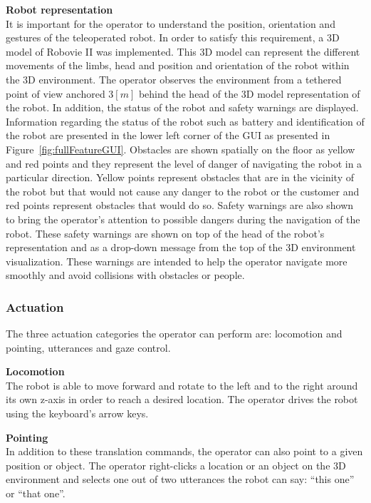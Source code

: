 \documentclass[a4paper, 10pt, conference]{ieeeconf}     %
\begin{document}
{\bf Robot representation}\\
It is important for the operator to understand the position, orientation and gestures of the teleoperated robot. 
In order to satisfy this requirement, a 3D model of Robovie II was implemented. 
This 3D model can represent the different movements of the limbs, head and position and orientation of the robot within the 3D environment.
The operator observes the environment from a tethered point of view anchored 3$[m]$ behind the head of the 3D model representation of the robot.
In addition, the status of the robot and safety warnings are displayed. 
Information regarding the status of the robot such as battery and identification of the robot are presented in the lower left corner of the GUI as presented in Figure~\ref{fig:fullFeatureGUI}.
Obstacles are shown spatially on the floor as yellow and red points and they represent the level of danger of navigating the robot in a particular direction.
Yellow points represent obstacles that are in the vicinity of the robot but that would not cause any danger to the robot or the customer and red points represent obstacles that would do so.
Safety warnings are also shown to bring the operator's attention to possible dangers during the navigation of the robot. 
These safety warnings are shown on top of the head of the robot's representation and as a drop-down message from the top of the 3D environment visualization.
These warnings are intended to help the operator navigate more smoothly and avoid collisions with obstacles or people.

\subsubsection{Actuation}
The three actuation categories the operator can perform are: locomotion and pointing, utterances and gaze control. 

{\bf Locomotion}\\
The robot is able to move forward and rotate to the left and to the right around its own z-axis in order to reach a desired location. 
The operator drives the robot using the keyboard's arrow keys. 

{\bf Pointing}\\
In addition to these translation commands, the operator can also point to a given position or object. 
The operator right-clicks a location or an object on the 3D environment and selects one out of two utterances the robot can say: ``this one'' or ``that one''.
\end{document}
